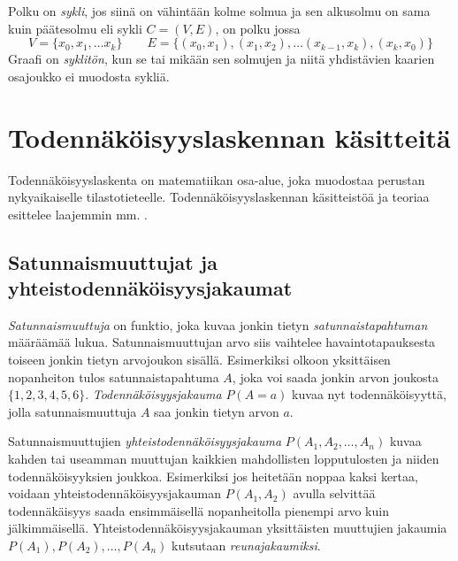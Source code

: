 \begin{center}
\centering
\begin{minipage}{.5\textwidth}
  \centering
\end{minipage}%
\begin{minipage}{.5\textwidth}
  \centering
\end{minipage}
\end{center}


Polku on \emph{sykli}, jos siinä on vähintään kolme solmua ja sen alkusolmu on sama kuin päätesolmu eli sykli $C = (V, E)$, on polku jossa
$$
    V = \{x_0, x_1, \ldots x_k \} \qquad E = \{(x_0, x_1), (x_1,x_2),\ldots(x_{k-1}, x_k), (x_k, x_0)\}
$$
Graafi on \emph{syklitön}, kun se tai mikään sen solmujen ja niitä yhdistävien kaarien osajoukko ei muodosta sykliä. 

\section{Todennäköisyyslaskennan käsitteitä}
Todennäköisyyslaskenta on matematiikan osa-alue, joka muodostaa perustan nykyaikaiselle tilastotieteelle. Todennäköisyyslaskennan käsitteistöä ja teoriaa esittelee laajemmin mm. \citet{dasgupta_probability_2011}.

\subsection{Satunnaismuuttujat ja yhteistodennäköisyysjakaumat}
\emph{Satunnaismuuttuja} on funktio, joka kuvaa jonkin tietyn \emph{satunnaistapahtuman} määräämää lukua. Satunnaismuuttujan arvo siis vaihtelee havaintotapauksesta toiseen jonkin tietyn arvojoukon sisällä. Esimerkiksi olkoon yksittäisen nopanheiton tulos satunnaistapahtuma $A$, joka voi saada jonkin arvon joukosta $\{1,2,3,4,5,6\}$. \emph{Todennäköisyysjakauma} $P(A=a)$ kuvaa nyt todennäköisyyttä, jolla satunnaismuuttuja $A$ saa jonkin tietyn arvon $a$.

Satunnaismuuttujien \emph{yhteistodennäköisyysjakauma} $P(A_1, A_2, \ldots ,A_n)$ kuvaa kahden tai useamman muuttujan kaikkien mahdollisten lopputulosten ja niiden todennäköisyyksien joukkoa. Esimerkiksi jos heitetään noppaa kaksi kertaa, voidaan yhteistodennäköisyysjakauman $P(A_1, A_2)$ avulla selvittää todennäkäisyys saada ensimmäisellä nopanheitolla pienempi arvo kuin jälkimmäisellä. Yhteistodennäköisyysjakauman yksittäisten muuttujien jakaumia $P(A_1), P(A_2),\dots, P(A_n)$ kutsutaan \emph{reunajakaumiksi}.

